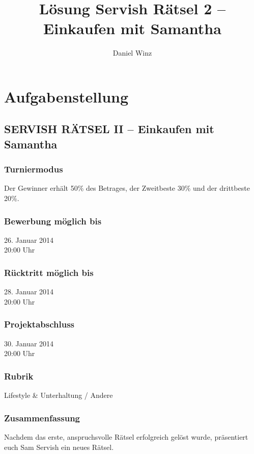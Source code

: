 \documentclass[10pt, fleqn]{article}
\title{Lösung Servish Rätsel 2 -- Einkaufen mit Samantha}
\author{Daniel Winz}
\begin{document}
\vfill
\maketitle
\vfill
\tableofcontents
\vfill
\newpage

\section{Aufgabenstellung}

\subsection*{SERVISH RÄTSEL II -- Einkaufen mit Samantha}

\subsubsection*{Turniermodus}
Der Gewinner erhält 50\% des Betrages, der Zweitbeste 30\% und der drittbeste 20\%. 

\subsubsection*{Bewerbung möglich bis}
26. Januar 2014 \\
20:00 Uhr 

\subsubsection*{Rücktritt möglich bis}
28. Januar 2014 \\
20:00 Uhr 

\subsubsection*{Projektabschluss}
30. Januar 2014 \\
20:00 Uhr 

\subsubsection*{Rubrik}
Lifestyle \& Unterhaltung / Andere

\subsubsection*{Zusammenfassung}
Nachdem das erste, anspruchsvolle Rätsel erfolgreich gelöst wurde, präsentiert 
euch Sam Servish ein neues Rätsel. 
\end{document}
